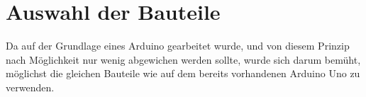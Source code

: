 \section{Auswahl der Bauteile}
Da auf der Grundlage eines Arduino gearbeitet wurde, und von diesem Prinzip  nach Möglichkeit nur wenig abgewichen werden sollte, wurde sich darum bemüht, möglichst die gleichen Bauteile wie auf dem bereits vorhandenen Arduino Uno zu verwenden. 